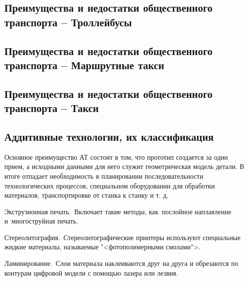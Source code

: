 \subsection{Преимущества и недостатки общественного транспорта -- Троллейбусы}


\subsection{Преимущества и недостатки общественного транспорта -- Маршрутные такси}


\subsection{Преимущества и недостатки общественного транспорта -- Такси}


\subsection{Аддитивные технологии, их классификация}

Основное преимущество АТ состоит в том, что прототип создается за один прием, а исходными данными для него служит геометрическая модель детали. В итоге отпадает необходимость в планировании последовательности технологических процессов, специальном оборудовании для обработки материалов, транспортировке от станка к станку и т. д.

Экструзионная печать. Включает такие методы, как послойное наплавление и многоструйная печать.

Стереолитография. Стереолитографические принтеры используют специальные жидкие материалы, называемые "<фотополимерными смолами">.

Ламинирование. Слои материала наклеиваются друг на друга и обрезаются по контурам цифровой модели с помощью лазера или лезвия. 
